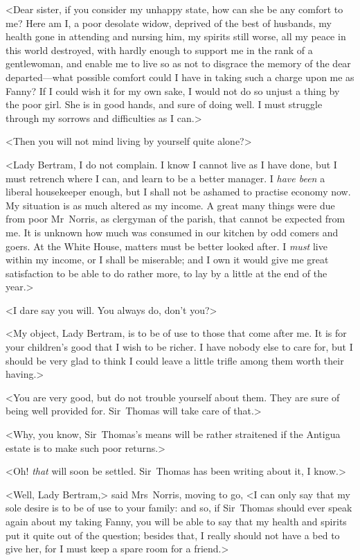 <Dear sister, if you consider my unhappy state, how can she be any comfort to me? Here am I, a poor desolate widow, deprived of the best of husbands, my health gone in attending and nursing him, my spirits still worse, all my peace in this world destroyed, with hardly enough to support me in the rank of a gentlewoman, and enable me to live so as not to disgrace the memory of the dear departed—what possible comfort could I have in taking such a charge upon me as Fanny? If I could wish it for my own sake, I would not do so unjust a thing by the poor girl. She is in good hands, and sure of doing well. I must struggle through my sorrows and difficulties as I can.>

<Then you will not mind living by yourself quite alone?>

<Lady Bertram, I do not complain. I know I cannot live as I have done, but I must retrench where I can, and learn to be a better manager. I \textit{have been}  a liberal housekeeper enough, but I shall not be ashamed to practise economy now. My situation is as much altered as my income. A great many things were due from poor Mr~Norris, as clergyman of the parish, that cannot be expected from me. It is unknown how much was consumed in our kitchen by odd comers and goers. At the White House, matters must be better looked after. I \textit{must}  live within my income, or I shall be miserable; and I own it would give me great satisfaction to be able to do rather more, to lay by a little at the end of the year.>

<I dare say you will. You always do, don't you?>

<My object, Lady Bertram, is to be of use to those that come after me. It is for your children's good that I wish to be richer. I have nobody else to care for, but I should be very glad to think I could leave a little trifle among them worth their having.>

<You are very good, but do not trouble yourself about them. They are sure of being well provided for. Sir~Thomas will take care of that.>

<Why, you know, Sir~Thomas's means will be rather straitened if the Antigua estate is to make such poor returns.>

<Oh! \textit{that}  will soon be settled. Sir~Thomas has been writing about it, I know.>

<Well, Lady Bertram,> said Mrs~Norris, moving to go, <I can only say that my sole desire is to be of use to your family: and so, if Sir~Thomas should ever speak again about my taking Fanny, you will be able to say that my health and spirits put it quite out of the question; besides that, I really should not have a bed to give her, for I must keep a spare room for a friend.>

